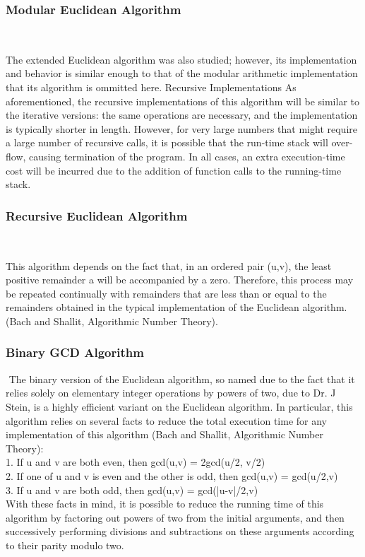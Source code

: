 \documentclass[11pt]{article}
\begin{document}
\subsubsection{Modular Euclidean Algorithm}$ $

\indent The extended Euclidean algorithm was also studied; however, its implementation and behavior is similar enough to that of the modular arithmetic implementation  that its algorithm is ommitted here.
Recursive Implementations
As aforementioned, the recursive implementations of this algorithm will be similar to the iterative versions: the same operations are necessary, and the implementation is typically shorter in length. However, for very large numbers that might require a large number of recursive calls, it is possible that the run-time stack will over-flow, causing termination of the program. In all cases, an extra execution-time cost will be incurred due to the addition of function calls to the running-time stack.

\subsubsection{Recursive Euclidean Algorithm}$ $

\indent This algorithm depends on the fact that, in an ordered pair (u,v), the least positive remainder a will be accompanied by a zero. Therefore, this process may be repeated continually with remainders that are less than or equal to the remainders obtained in the typical implementation of the Euclidean algorithm.
(Bach and Shallit, Algorithmic Number Theory).

\subsubsection{Binary GCD Algorithm}$ $
\indent The binary version of the Euclidean algorithm, so named due to the fact that it relies solely on elementary integer operations by powers of two, due to Dr. J Stein, is a highly efficient variant on the Euclidean algorithm. In particular, this algorithm relies on several facts to reduce the total execution time for any implementation of this algorithm (Bach and Shallit, Algorithmic Number Theory):
\\
1.     If u and v are both even, then gcd(u,v) = 2gcd(u/2, v/2)\\
2.     If one of u and v is even and the other is odd, then gcd(u,v) = gcd(u/2,v)\\
3.     If u and v are both odd, then gcd(u,v) = gcd(|u-v|/2,v)
\\
With these facts in mind, it is possible to reduce the running time of this algorithm by factoring out powers of two from the initial arguments, and then successively performing divisions and subtractions on these arguments according to their parity modulo two.
\end{document}
